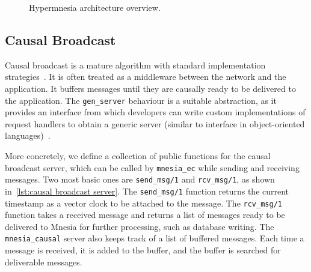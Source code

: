 \begin{figure*}[htp]
  \caption{Hypermnesia architecture overview.}
  \label{fig:hypermnesia arch}
\end{figure*}


\subsection{Causal Broadcast} \label{sec:impl cbcast}

Causal broadcast is a mature algorithm with standard implementation 
strategies~\cite{schmuck1988broadcast,birman1991causal}. 
It is often treated as a middleware between the
network and the application. It buffers messages until they are causally ready
to be delivered to the application. The \texttt{gen_server} behaviour
is a suitable abstraction, as it provides an interface from which
developers can write custom implementations of request handlers to obtain a
generic server (similar to interface in object-oriented 
languages)~\cite{ericssonab2023otpdesign}.

More concretely, we define a collection of public functions for the causal broadcast
server, which can be called by \texttt{mnesia_ec} while sending
and receiving messages. Two most basic ones are \texttt{send_msg/1}
and \texttt{rcv_msg/1}, as shown in~\cref{lst:causal broadcast server}.
The \texttt{send_msg/1} function returns the current timestamp
as a vector clock to be attached to the message.  The \texttt{rcv_msg/1}
function takes a received message and returns a list of messages ready to be
delivered to Mnesia for further processing, such as database writing.
The \texttt{mnesia_causal} server also keeps track of a list of buffered messages.
Each time a message is received, it is added to the buffer, and the buffer is
searched for deliverable messages.


